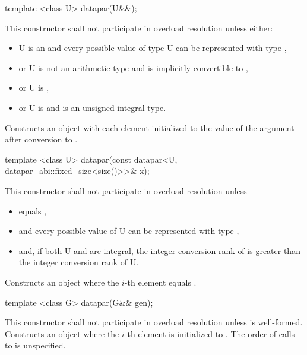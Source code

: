 \begin{itemdecl}
template <class U> datapar(U&&);
\end{itemdecl}
\begin{itemdescr}
  \pnum\remarks This constructor shall not participate in overload resolution unless either:
  \begin{itemize}
    \item \type U is an \realArithmeticType and every possible value of type \type U can be represented with type ,
    \item or \type U is not an arithmetic type and is implicitly convertible to ,
    \item or \type U is \intt,
    \item or \type U is \uint and  is an unsigned integral type.
  \end{itemize}
  \pnum\effects Constructs an object with each element initialized to the value of the argument after conversion to .
\end{itemdescr}

\begin{itemdecl}
template <class U> datapar(const datapar<U, datapar_abi::fixed_size<size()>>& x);
\end{itemdecl}
\begin{itemdescr}
  \pnum\remarks This constructor shall not participate in overload resolution unless
  \begin{itemize}
    \item {} equals \fixedsizescoped{},
    \item and every possible value of \type U can be represented with type ,
    \item and, if both \type U and  are integral, the integer conversion rank \parencite[(4.15)]{N4618} of  is greater than the integer conversion rank of \type U.
  \end{itemize}
  \pnum\effects Constructs an object where the $i$-th element equals  \foralli.
\end{itemdescr}

\begin{itemdecl}
template <class G> datapar(G&& gen);
\end{itemdecl}
\begin{itemdescr}
  \pnum\remarks This constructor shall not participate in overload resolution unless  is well-formed.%
  \pnum\effects Constructs an object where the $i$-th element is initialized to .
  \pnum\remarks The order of calls to  is unspecified.
\end{itemdescr}


